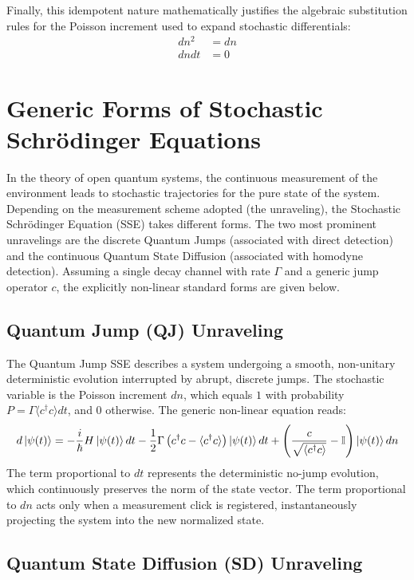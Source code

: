 \documentclass[a4paper,12pt]{article}
\begin{document}
	Finally, this idempotent nature mathematically justifies the algebraic substitution rules for the Poisson increment used to expand stochastic differentials:
	\begin{align}
		dn^2 &= dn \\
		dn dt &= 0
	\end{align}
	
	\section{Generic Forms of Stochastic Schrödinger Equations}
	
	In the theory of open quantum systems, the continuous measurement of the environment leads to stochastic trajectories for the pure state of the system. Depending on the measurement scheme adopted (the unraveling), the Stochastic Schrödinger Equation (SSE) takes different forms. The two most prominent unravelings are the discrete Quantum Jumps (associated with direct detection) and the continuous Quantum State Diffusion (associated with homodyne detection). Assuming a single decay channel with rate $\Gamma$ and a generic jump operator $c$, the explicitly non-linear standard forms are given below.
	
	\subsection{Quantum Jump (QJ) Unraveling}
	
	The Quantum Jump SSE describes a system undergoing a smooth, non-unitary deterministic evolution interrupted by abrupt, discrete jumps. The stochastic variable is the Poisson increment $dn$, which equals $1$ with probability $P = \Gamma \langle c^\dagger c \rangle dt$, and $0$ otherwise. The generic non-linear equation reads:
	\begin{equation}
		d\ket{\psi(t)} = -\frac{i}{\hbar} H \ket{\psi(t)} dt - \frac{1}{2} \Gamma \left( c^\dagger c - \langle c^\dagger c \rangle \right) \ket{\psi(t)} dt + \left( \frac{c}{\sqrt{\langle c^\dagger c \rangle}} - \mathbb{I} \right) \ket{\psi(t)} dn
		\label{eq:generic_QJ}
	\end{equation}
	The term proportional to $dt$ represents the deterministic no-jump evolution, which continuously preserves the norm of the state vector. The term proportional to $dn$ acts only when a measurement click is registered, instantaneously projecting the system into the new normalized state.
	
	\subsection{Quantum State Diffusion (SD) Unraveling}
	
\end{document}
